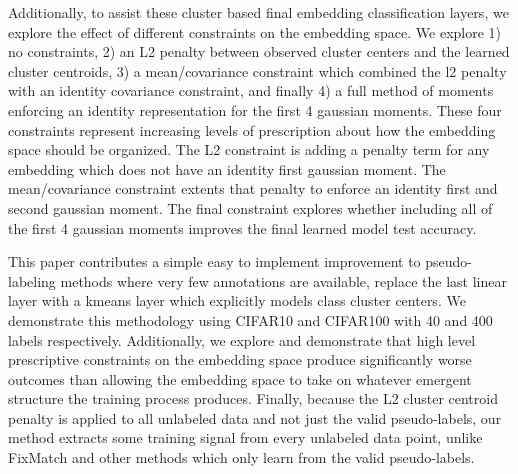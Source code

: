 \documentclass[10pt,twocolumn,letterpaper]{article}
\begin{document}

Additionally, to assist these cluster based final embedding classification layers, we explore the effect of different constraints on the embedding space.
We explore 1) no constraints, 2) an L2 penalty between observed cluster centers and the learned cluster centroids, 3) a mean/covariance constraint which combined the l2 penalty with an identity covariance constraint, and finally 4) a full method of moments enforcing an identity representation for the first 4 gaussian moments. 
These four constraints represent increasing levels of prescription about how the embedding space should be organized.
The L2 constraint is adding a penalty term for any embedding which does not have an identity first gaussian moment.
The mean/covariance constraint extents that penalty to enforce an identity first and second gaussian moment.
The final constraint explores whether including all of the first 4 gaussian moments improves the final learned model test accuracy. 

This paper contributes a simple easy to implement improvement to pseudo-labeling methods where very few annotations are available, replace the last linear layer with a kmeans layer which explicitly models class cluster centers.
We demonstrate this methodology using CIFAR10 and CIFAR100 \cite{cifar10} with 40 and 400 labels respectively. 
Additionally, we explore and demonstrate that high level prescriptive constraints on the embedding space produce significantly worse outcomes than allowing the embedding space to take on whatever emergent structure the training process produces. 
Finally, because the L2 cluster centroid penalty is applied to all unlabeled data and not just the valid pseudo-labels, our method extracts some training signal from every unlabeled data point, unlike FixMatch \cite{sohn2020fixmatch} and other methods which only learn from the valid pseudo-labels.




\end{document}
